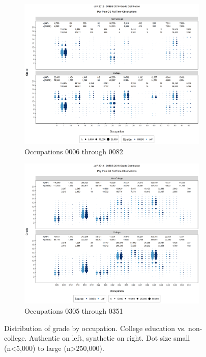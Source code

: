 \documentclass[10pt, letterpaper]{article}
\begin{document}
\begin{spacing}{1.0}
\clearpage

\begin{figure}[]
    \centering
    \begin{subfigure}{1\textwidth}
        \centering
        \includegraphics[width=6in, trim={0 0.55in 0 0.75in}, clip]{JdFDIBBSGSFullTimeGradeCollegeOccupation1.png}
        \caption{Occupations 0006 through 0082}
        \vspace{10pt}
    \end{subfigure}
    \begin{subfigure}{1\textwidth}
        \centering
        \includegraphics[width=6in, trim={0 0.55in 0 0.75in}, clip]{JdFDIBBSGSFullTimeGradeCollegeOccupation81.png}
        \caption{Occupations 0305 through 0351}
    \end{subfigure}
    \caption{Distribution of grade by occupation.  College education vs. non-college.  Authentic on left, synthetic on right.  Dot size small (n<5,000) to large (n>250,000).}
    \label{figure:JdFDIBBSGSFullTimeGradeCollegeOccupation}
\end{figure}


\end{spacing}
\end{document}
